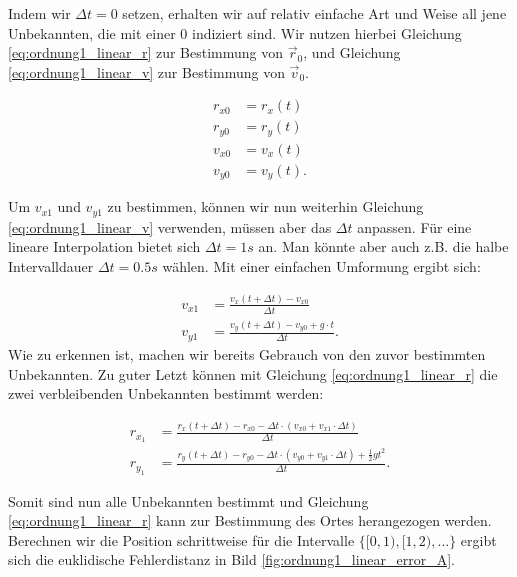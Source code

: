Indem wir $\Delta t = 0$ setzen, erhalten wir auf relativ einfache Art und Weise all jene Unbekannten, die mit einer $0$ indiziert sind.
Wir nutzen hierbei Gleichung \eqref{eq:ordnung1_linear_r} zur Bestimmung von $\vec{r}_0$, und Gleichung \eqref{eq:ordnung1_linear_v} zur Bestimmung von $\vec{v}_0$.

\begin{equation}
\label{eq:ordnung1_linear_solutionPart1}
\begin{aligned}
r_{x0} &= r_x(t) \\
r_{y0} &= r_y(t) \\
v_{x0} &= v_x(t) \\
v_{y0} &= v_y(t).
\end{aligned}
\end{equation}

Um $v_{x1}$ und $v_{y1}$ zu bestimmen, können wir nun weiterhin Gleichung \eqref{eq:ordnung1_linear_v} verwenden, müssen aber das $\Delta t$ anpassen.
Für eine lineare Interpolation bietet sich $\Delta t = 1s$ an.
Man könnte aber auch z.B. die halbe Intervalldauer $\Delta t = 0.5s$ wählen.
Mit einer einfachen Umformung ergibt sich:

\begin{equation}
\label{eq:ordnung1_linear_solutionPart2}
\begin{aligned}
v_{x1} &=  \frac{v_x(t + \Delta t) - v_{x0}}{\Delta t} \\
v_{y1} &=  \frac{v_y(t + \Delta t) - v_{y0} + g \cdot t}{\Delta t}.
\end{aligned}
\end{equation}
Wie zu erkennen ist, machen wir bereits Gebrauch von den zuvor bestimmten Unbekannten.
Zu guter Letzt können mit Gleichung \eqref{eq:ordnung1_linear_r} die zwei verbleibenden Unbekannten bestimmt werden:

\begin{equation}
\label{eq:ordnung1_linear_solutionPart3}
\begin{aligned}
r_{x_1} &= \frac{r_x(t + \Delta t) - r_{x0} - \Delta t \cdot(v_{x0} + v_{x1}  \cdot \Delta t)}{\Delta t} \\
r_{y_1} &= \frac{r_y(t + \Delta t) - r_{y0} - \Delta t \cdot(v_{y0} + v_{y1}  \cdot \Delta t) + \frac{1}{2}gt^2}{\Delta t}.
\end{aligned}
\end{equation}


Somit sind nun alle Unbekannten bestimmt und Gleichung \eqref{eq:ordnung1_linear_r} kann zur Bestimmung des Ortes herangezogen werden.
Berechnen wir die Position schrittweise für die Intervalle $\{[0,1), [1, 2), \dots\}$ ergibt sich die euklidische Fehlerdistanz in Bild \ref{fig:ordnung1_linear_error_A}.

